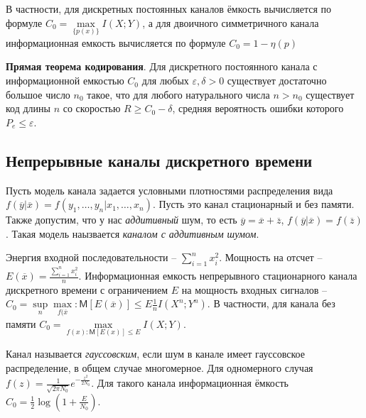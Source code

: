 \documentclass[a4paper,12pt]{article}
\newcommand{\MExpect}{\mathsf{M}}
\begin{document}
В частности, для дискретных постоянных каналов ёмкость вычисляется по формуле $C_0=\max\limits_{\{p(x)\}}I(X;Y)$, а для двоичного симметричного канала информационная емкость вычисляется по формуле $C_0=1-\eta(p)$

\textbf{Прямая теорема кодирования}. Для дискретного постоянного канала с информационной емкостью $C_0$ для любых $\varepsilon,\delta>0$ существует достаточно большое число $n_0$ такое, что для любого натурального числа $n>n_0$ существует код длины $n$ со скоростью $R\ge C_0-\delta$, средняя вероятность ошибки которого $P_e\le\varepsilon$.

\subsection*{Непрерывные каналы дискретного времени}

Пусть модель канала задается условными плотностями распределения вида $f(\overline y|\overline x)=f(y_1,\dots,y_n|x_1,\dots,x_n)$. Пусть это канал стационарный и без памяти. Также допустим, что у нас \textit{аддитивный} шум, то есть $\overline y = \overline x + \overline z$, $f(\overline y|\overline x)=f(\overline z)$. Такая модель наызвается \textit{каналом с аддитивным шумом}.

Энергия входной последовательности -- $\sum\limits_{i=1}^{n}x_i^2$. Мощность на отсчет -- $E(\overline x)=\frac{\sum\limits_{i=1}^{n}x_i^2}{n}$. Информационная емкость непрерывного стационарного канала дискретного времени с ограничением $E$ на мощность входных сигналов -- $C_0=\sup\limits_n\max\limits_{f(\overline x}:\MExpect [E(\overline x)]\le E\frac{1}{n}I(X^n;Y^n)$. В частности, для канала без памяти $C_0=\max\limits_{f(x):\MExpect [E(x)]\le E}I(X;Y)$.

Канал называется \textit{гауссовским}, если шум в канале имеет гауссовское распределение, в общем случае многомерное. Для одномерного случая $f(z)=\frac{1}{\sqrt{2\pi N_0}}e^{-\frac{z^2}{2N_0}}$. Для такого канала информационная ёмкость $C_0=\frac{1}{2}\log(1+\frac{E}{N_0})$.
\end{document}
